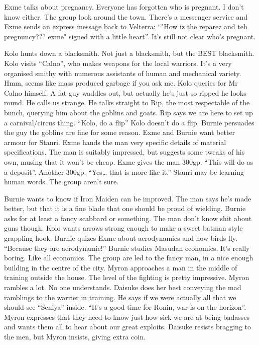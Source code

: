 Exme talks about pregnancy. Everyone has forgotten who is pregnant. I don’t know either. The group look around the town. There’s a messenger service and Exme sends an express message back to Velterra: “"How iz the reparez and teh pregnuncy??? exme" signed with a little heart”. It’s still not clear who’s pregnant.\medskip

Kolo hunts down a blacksmith. Not just a blacksmith, but the BEST blacksmith. Kolo visits “Calno”, who makes weapons for the local warriors. It’s a very organised smithy with numerous assistants of human and mechanical variety. Hmm, seems like mass produced garbage if you ask me. Kolo queries for Mr Calno himself. A fat guy waddles out, but actually he’s just so ripped he looks round. He calls us strange. He talks straight to Rip, the most respectable of the bunch, querying him about the goblins and goats. Rip says we are here to set up a carnival/circus thing. “Kolo, do a flip” Kolo doesn’t do a flip. Burnie persuades the guy the goblins are fine for some reason. Exme and Burnie want better armour for Stanri. Exme hands the man very specific details of material specifications. The man is suitably impressed, but suggests some tweaks of his own, musing that it won’t be cheap. Exme gives the man 300gp. “This will do as a deposit”. Another 300gp. “Yes… that is more like it.” Stanri may be learning human words. The group aren’t sure.\medskip

Burnie wants to know if Iron Maiden can be improved. The man says he’s made better, but that it is a fine blade that one should be proud of wielding. Burnie asks for at least a fancy scabbard or something. The man don’t know shit about guns though. Kolo wants arrows strong enough to make a sweet batman style grappling hook. Burnie quizes Exme about aerodynamics and how birds fly. “Because they are aerodynamic!” Burnie studies Masudan economics. It’s really boring. Like all economics. The group are led to the fancy man, in a nice enough building in the centre of the city. Myron approaches a man in the middle of training outside the house. The level of the fighting is pretty impressive. Myron rambles a lot. No one understands. Daisuke does her best conveying the mad ramblings to the warrier in training. He says if we were actually all that we should see “Seniya” inside. “It’s a good time for Ronin, war is on the horizon”. Myron expresses that they need to know just how sick we are at being badasses and wants them all to hear about our great exploits. Daisuke resists bragging to the men, but Myron insists, giving extra coin.\medskip

